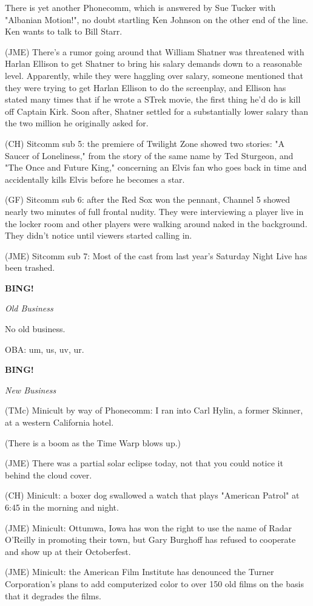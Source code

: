 \documentclass[12pt]{article}
\newcommand{\bing}{{\bf BING!} }
\newcommand{\goto}[1]{\bing \vskip 12pt \centerline{{\em{#1}}}}
\begin{document}
There is yet another Phonecomm, which is answered by Sue Tucker with "Albanian Motion!", no doubt startling Ken Johnson on the other end of the line. Ken wants to talk to Bill Starr.

(JME) There's a rumor going around that William Shatner was threatened with Harlan Ellison to get Shatner to bring his salary demands down to a reasonable level. Apparently, while they were haggling over salary, someone mentioned that they were trying to get Harlan Ellison to do the screenplay, and Ellison has stated many times that if he wrote a STrek movie, the first thing he'd do is kill off Captain Kirk. Soon after, Shatner settled for a substantially lower salary than the two million he originally asked for.

(CH) Sitcomm sub 5: the premiere of Twilight Zone showed two stories: "A Saucer of Loneliness," from the story of the same name by Ted Sturgeon, and "The Once and Future King," concerning an Elvis fan who goes back in time and accidentally kills Elvis before he becomes a star.

(GF) Sitcomm sub 6: after the Red Sox won the pennant, Channel 5 showed nearly two minutes of full frontal nudity. They were interviewing a player live in the locker room and other players were walking around naked in the background. They didn't notice until viewers started calling in.

(JME) Sitcomm sub 7: Most of the cast from last year's Saturday Night Live has been trashed.

\goto{Old Business}

No old business.

OBA: um, us, uv, ur.

\goto{New Business}

(TMc) Minicult by way of Phonecomm: I ran into Carl Hylin, a former Skinner, at a western California hotel.

(There is a boom as the Time Warp blows up.)

(JME) There was a partial solar eclipse today, not that you could notice it behind the cloud cover.

(CH) Minicult: a boxer dog swallowed a watch that plays "American Patrol" at 6:45 in the morning and night.

(JME) Minicult: Ottumwa, Iowa has won the right to use the name of Radar O'Reilly in promoting their town, but Gary Burghoff has refused to cooperate and show up at their Octoberfest.

(JME) Minicult: the American Film Institute has denounced the Turner Corporation's plans to add computerized color to over 150 old films on the basis that it degrades the films.
\end{document}
